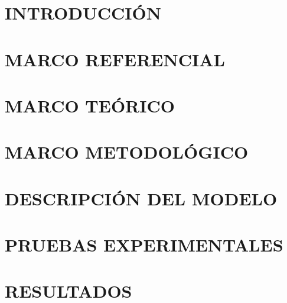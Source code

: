 \documentclass[letterpaper,titlepage,12pt,oneside,spanish,final]{report_eie}
\numberwithin{equation}{chapter}%
\numberwithin{figure}{chapter}%
\numberwithin{table}{chapter}%
\numberwithin{definition}{chapter}%
\numberwithin{lemma}{chapter}%
\numberwithin{theorem}{chapter}%
\numberwithin{corollary}{chapter}%
\numberwithin{condition}{chapter}%
\numberwithin{criterion}{chapter}%
\numberwithin{problem}{chapter}%
\numberwithin{property}{chapter}%
\numberwithin{proposition}{chapter}%
\numberwithin{solution}{chapter}%
\numberwithin{conjecture}{chapter}%
\begin{document}
\chapter*{INTRODUCCIÓN}\label{CAP:intro}
\setlength{\parskip}{14pt}%
%

%
%

\chapter{MARCO REFERENCIAL}\label{CAP:marcoref}
%

\chapter{MARCO TEÓRICO}\label{CAP:teor}
%

\chapter{MARCO METODOLÓGICO}\label{CAP:met}

\chapter{DESCRIPCIÓN DEL MODELO}\label{CAP:mod}
%

\chapter{PRUEBAS EXPERIMENTALES}\label{CAP:exp}
%

\chapter{RESULTADOS}\label{CAP:resultados}
%
\end{document}
